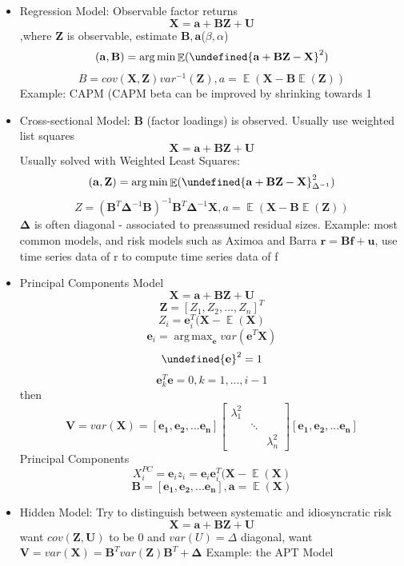 \documentclass[11pt, openany]{book}              %
\let\norm\undefined %
\DeclarePairedDelimiter\norm{\lVert}{\rVert}
\DeclareMathOperator*{\argmax}{arg\,max}  %
\DeclareMathOperator*{\argmin}{arg\,min}  %
\DeclareMathOperator{\E}{\mathbb{E}}
\begin{document}
\begin{itemize}
	\item Regression Model: Observable factor returns
	$$ \mathbf{X} =  \mathbf{a} +  \mathbf{BZ} +  \mathbf{U}$$ ,where $\mathbf{Z}$ is observable, estimate $\mathbf{B, a}$($\beta, \alpha$)
	$$(\mathbf{a,B}) = \argmin \E( \norm{\mathbf{a} + \mathbf{BZ} - \mathbf{X}}^2)$$
	$$ B = cov(\mathbf{X,Z}) var^{-1} (\mathbf{Z}), a = \E(\mathbf{X} - \mathbf{B}\E(\mathbf{Z}))$$
	Example: CAPM (CAPM beta can be improved by shrinking towards 1
	\item Cross-sectional Model: $\mathbf{B}$ (factor loadings) is observed. Usually use weighted list squares
	$$ \mathbf{X} =  \mathbf{a} +  \mathbf{BZ} +  \mathbf{U}$$ 
	Usually solved with Weighted Least Squares:
	$$(\mathbf{a,Z}) = \argmin \E( \norm{\mathbf{a} + \mathbf{BZ} - \mathbf{X}}^2_{\Delta^{-1}})$$
	$$ Z = (\mathbf{B}^T \mathbf{\Delta}^{-1} \mathbf{B})^{-1} \mathbf{B}^T \mathbf{\Delta}^{-1} \mathbf{X}, a = \E(\mathbf{X} - \mathbf{B}\E(\mathbf{Z}))$$
	$\mathbf{\Delta}$ is often diagonal - associated to preassumed residual sizes.
	Example: most common models, and risk models such as Aximoa and Barra $\mathbf{r} = \mathbf{Bf} + \mathbf{u}$, use time series data of r to compute time series data of f
	
	\item Principal Components Model
	$$ \mathbf{X} =  \mathbf{a} +  \mathbf{BZ} +  \mathbf{U}$$
	 $$\mathbf{Z} = [Z_1, Z_2, ..., Z_n]^T$$
	 $$ Z_i = \mathbf{e}_i^T(\mathbf{X} - \E(\mathbf{X})$$
	 $$ \mathbf{e}_i = \argmax _{\mathbf{e}} var(\mathbf{e}^T\mathbf{X})$$
	 $$\norm{\mathbf{e}}^2 = 1$$
	 $$ \mathbf{e}_k^T \mathbf{e} = 0, k = 1,...,i-1$$
	 then 
	 $$\mathbf{V} = var(\mathbf{X}) = [\mathbf{e_1}, \mathbf{e_2},...\mathbf{e_n}]
	 \begin{bmatrix} 
  				 \lambda_1^2 & & \\ 
  				  & \ddots & \\
  				 &  & \lambda_n^2
	\end{bmatrix} [\mathbf{e_1}, \mathbf{e_2},...\mathbf{e_n}]
	 $$
	 Principal Components
	 $$X_i^{PC} = \mathbf{e}_i z_i = \mathbf{e}_i \mathbf{e}_i^ T(\mathbf{X} - \E( \mathbf{X})$$
	 $$\mathbf{B}= [\mathbf{e_1}, \mathbf{e_2},...\mathbf{e_n}], \mathbf{a} = \E( \mathbf{X})$$
	 
	\item Hidden Model: Try to distinguish between systematic and idiosyncratic risk 
	$$ \mathbf{X} =  \mathbf{a} +  \mathbf{BZ} +  \mathbf{U}$$ 
	want $cov(\mathbf{Z}, \mathbf{U})$ to be 0 and $var(U) = \Delta$ diagonal,
	want $\mathbf{V} = var(\mathbf{X}) = \mathbf{B}^T var(\mathbf{Z}) \mathbf{B}^T + \mathbf{\Delta}$
	Example: the APT Model
\end{itemize}
\end{document}
